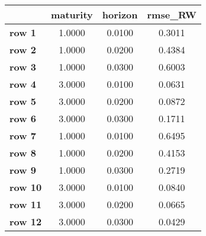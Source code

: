 \begin{tiny}\begin{tabular}{|l|c|c|c|}
\hline
&\textbf{maturity}&\textbf{horizon}&\textbf{rmse_RW}\\\hline
\textbf{row 1}&1.0000&0.0100&0.3011\\\hline
\textbf{row 2}&1.0000&0.0200&0.4384\\\hline
\textbf{row 3}&1.0000&0.0300&0.6003\\\hline
\textbf{row 4}&3.0000&0.0100&0.0631\\\hline
\textbf{row 5}&3.0000&0.0200&0.0872\\\hline
\textbf{row 6}&3.0000&0.0300&0.1711\\\hline
\textbf{row 7}&1.0000&0.0100&0.6495\\\hline
\textbf{row 8}&1.0000&0.0200&0.4153\\\hline
\textbf{row 9}&1.0000&0.0300&0.2719\\\hline
\textbf{row 10}&3.0000&0.0100&0.0840\\\hline
\textbf{row 11}&3.0000&0.0200&0.0665\\\hline
\textbf{row 12}&3.0000&0.0300&0.0429\\\hline
\end{tabular}
\end{tiny}